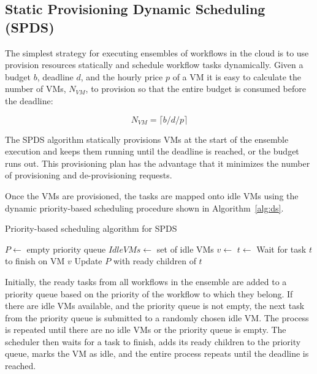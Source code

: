 \documentclass{sig-alternate}
\begin{document}
\subsection{Static Provisioning Dynamic Scheduling \\
(SPDS) }
\label{sec:spds}

The simplest strategy for executing ensembles of workflows in the cloud is to use
provision resources statically and schedule workflow tasks dynamically. Given a 
budget $b$, deadline $d$, and the hourly price $p$ of a VM it is easy to calculate
the number of VMs, $N_{VM}$, to provision so that the entire budget is consumed before
the deadline:

\begin{equation}
\label{eq:static-plan}
N_{VM} = \lceil b / d / p \rceil
\end{equation}

The SPDS algorithm statically provisions VMs at the start of the ensemble execution 
and keeps them running until the deadline is reached, or the budget runs out.
This provisioning plan has the advantage that it minimizes the number of provisioning 
and de-provisioning requests.

Once the VMs are provisioned, the tasks are mapped onto idle VMs using the dynamic
priority-based scheduling procedure shown in Algorithm~\ref{alg:ds}.

\begin{algorithm}
\caption{Priority-based scheduling algorithm for SPDS}
\label{alg:ds}
\begin{algorithmic}[1]
    \State $P\gets$ empty priority queue
	\State $IdleVMs\gets$ set of idle VMs
    	\State {} 
    \EndFor
    		\State $v\gets$ 
    		\State $t\gets$ 
    		\State {}
    	\EndWhile
    	\State Wait for task $t$ to finish on VM $v$
    	\State Update $P$ with ready children of $t$
		\State {}
    \EndWhile
\EndProcedure
\end{algorithmic} 
\end{algorithm}

Initially, the ready tasks from all workflows in the ensemble are added to a 
priority queue based on the priority of the workflow to which they belong. If
there are idle VMs available, and the priority queue is not empty, the next task
from the priority queue is submitted to a randomly chosen idle VM. The process is 
repeated until there are no idle VMs or the priority queue is empty. The scheduler
then waits for a task to finish, adds its ready children to the priority queue,
marks the VM as idle, and the entire process repeats until the deadline is reached.
\end{document}
